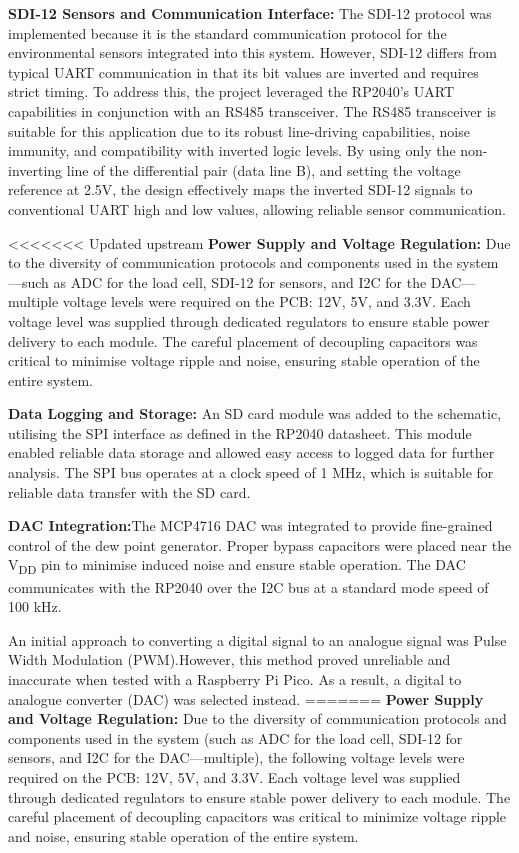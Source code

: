 \textbf{SDI-12 Sensors and Communication Interface:} The SDI-12 protocol was implemented because 
it is the standard communication protocol for the environmental sensors integrated into 
this system. However, SDI-12 differs from typical UART communication in that its bit 
values are inverted and requires strict timing. To address this, the project leveraged 
the RP2040's UART capabilities in conjunction with an RS485 transceiver. The RS485 
transceiver is suitable for this application due to its robust line-driving capabilities, 
noise immunity, and compatibility with inverted logic levels. By using only the non-inverting 
line of the differential pair (data line B), and setting the voltage reference at 2.5V, the design 
effectively maps the inverted SDI-12 signals to conventional UART high and low values, 
allowing reliable sensor communication.

<<<<<<< Updated upstream
\textbf{Power Supply and Voltage Regulation:} Due to the diversity of communication protocols and components used in the system—such as ADC for the load cell, SDI-12 for sensors, and I2C for the DAC—multiple voltage levels were required on the PCB: 12V, 5V, and 3.3V. Each voltage level was supplied through dedicated regulators to ensure stable power delivery to each module. The careful placement of decoupling capacitors was critical to minimise voltage ripple and noise, ensuring stable operation of the entire system.

\textbf{Data Logging and Storage:} An SD card module was added to the schematic, utilising the SPI interface as defined in the RP2040 datasheet. This module enabled reliable data storage and allowed easy access to logged data for further analysis. The SPI bus operates at a clock speed of 1 MHz, which is suitable for reliable data transfer with the SD card.

\textbf{DAC Integration:}The MCP4716 DAC was integrated to provide fine-grained control of the dew point generator. Proper bypass capacitors were placed near the V\textsubscript{DD} pin to minimise induced noise and ensure stable operation. The DAC communicates with the RP2040 over the I2C bus at a standard mode speed of 100 kHz.

An initial approach to converting a digital signal to an analogue signal was Pulse Width Modulation (PWM).However, this method proved unreliable and inaccurate when tested with a Raspberry Pi Pico. As a result, a digital to analogue converter (DAC) was selected instead.
=======
\textbf{Power Supply and Voltage Regulation:} Due to the diversity of communication protocols 
and components used in the system (such as ADC for the load cell, SDI-12 for sensors, and I2C 
for the DAC—multiple), the following voltage levels were required on the PCB: 12V, 5V, and 3.3V. Each voltage 
level was supplied through dedicated regulators to ensure stable power delivery to each module. 
The careful placement of decoupling capacitors was critical to minimize voltage ripple and noise, 
ensuring stable operation of the entire system.

